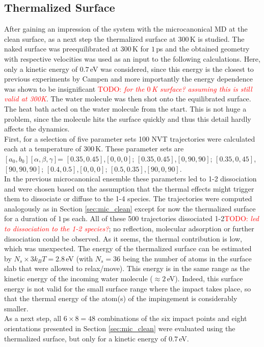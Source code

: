 \documentclass[11pt,DIV=13,BCOR=5mm,a4paper,headinclude]{scrbook}
\newcommand\todo[1]{\textcolor{red}{TODO: \textit{{#1}}}}
\begin{document}
\subsection{Thermalized Surface}\label{therm_surf}
After gaining an impression of the system with the microcanonical MD at the clean surface, as a next step the thermalized surface at $300\,$K is studied.
The naked surface was preequilibrated at $300\,$K for $1\,$ps and the obtained geometry with respective velocities was used as an input to the following calculations.
Here, only a kinetic energy of $0.7\,$eV was considered, since this energy is the closest to previous experiments by Campen and more importantly the energy dependence was shown to be insignificant \todo{for the $0\,$K surface? assuming this is still valid at 300K}.
The water molecule was then shot onto the equilibrated surface.
The heat bath acted on the water molecule from the start.
This is not huge a problem, since the molecule hits the surface quickly and thus this detail hardly affects the dynamics.
\\
First, for a selection of five parameter sets 100 NVT trajectories were calculated each at a temperature of $300\,$K.
These parameter sets are\\ $[a_0,b_0][\alpha,\beta,\gamma]$= $[0.35,0.45]$,$[0,0,0]$; $[0.35,0.45]$,$[0,90,90]$; $[0.35,0,45]$,$[90,90,90]$; $[0.4,0.5]$,$[0,0,0]$;  $[0.5,0.35]$,$[90,0,90]$.\\
In the previous microcanonical ensemble these parameters led to 1-2 dissociation and were chosen based on the assumption that the thermal effects might trigger them to dissociate or diffuse to the 1-4 species.
The trajectories were computed analogously as in Section \ref{sec:mic_clean} except for now the thermalized surface for a duration of $1\,$ps each.
All of these 500 trajectories dissociated 1-2\todo{led to dissociation to the 1-2 species?}; no reflection, molecular adsorption or further dissociation could be observed.
As it seems, the thermal contribution is low, which was unexpected.
The energy of the thermalized surface can be estimated by $N_s\times 3k_BT=2.8\,$eV (with $N_s=36$ being the number of atoms in the surface slab that were allowed to relax/move).
This energy is in the same range as the kinetic energy of the incoming water molecule ($\approx2\,$eV).
Indeed, this surface energy is not valid for the small surface range where the impact takes place, so that the thermal energy of the atom(s) of the impingement is considerably smaller.
\\
As a next step, all $6\times 8=48$ combinations of the six impact points and eight orientations presented in Section \ref{sec:mic_clean} were evaluated using the thermalized surface, but only for a kinetic energy of $0.7\,$eV.
\end{document}
